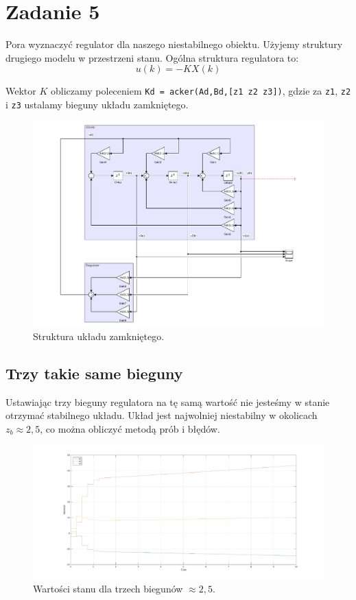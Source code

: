 \section{Zadanie 5} 
Pora wyznaczyć regulator dla naszego niestabilnego obiektu. Użyjemy struktury drugiego modelu w przestrzeni stanu. Ogólna struktura regulatora to:
\[
 u(k)=-KX(k)
\]

Wektor $K$ obliczamy poleceniem \texttt{Kd = acker(Ad,Bd,[z1 z2 z3])}, gdzie za \texttt{z1}, \texttt{z2} i \texttt{z3} ustalamy bieguny układu zamkniętego.
\begin{figure}[H]
\centering
 \includegraphics[width=\textwidth]{img/stp5.pdf}
\caption{Struktura układu zamkniętego.}
\end{figure}

\subsection{Trzy takie same bieguny}
Ustawiając trzy bieguny regulatora na tę samą wartość nie jesteśmy w stanie otrzymać stabilnego układu.
Układ jest najwolniej niestabilny w okolicach $z_b \approx 2,5$, co można obliczyć metodą prób i błędów.

\begin{figure}[H]
\centering
 \includegraphics[width=\textwidth]{img/plot5_1.pdf}
\caption{Wartości stanu dla trzech biegunów $\approx 2,5$.}
\end{figure}

